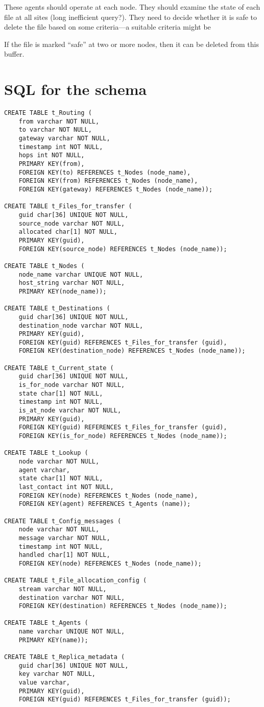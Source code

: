 \documentclass{cmspaper}
\begin{document}
These agents should operate at each node. They should examine the
state of each file at all sites (long inefficient query?). They need
to decide whether it is safe to delete the file based on some
criteria---a suitable criteria might be

If the file is marked ``safe'' at two or more nodes, then it can be
deleted from this buffer.

\section{SQL for the schema}

{\small \begin{verbatim}
CREATE TABLE t_Routing (
	from varchar NOT NULL, 
	to varchar NOT NULL, 
	gateway varchar NOT NULL, 
	timestamp int NOT NULL, 
	hops int NOT NULL, 
	PRIMARY KEY(from),
	FOREIGN KEY(to) REFERENCES t_Nodes (node_name),
	FOREIGN KEY(from) REFERENCES t_Nodes (node_name),
	FOREIGN KEY(gateway) REFERENCES t_Nodes (node_name));

CREATE TABLE t_Files_for_transfer (
	guid char[36] UNIQUE NOT NULL, 
	source_node varchar NOT NULL, 
	allocated char[1] NOT NULL, 
	PRIMARY KEY(guid),
	FOREIGN KEY(source_node) REFERENCES t_Nodes (node_name));

CREATE TABLE t_Nodes (
	node_name varchar UNIQUE NOT NULL, 
	host_string varchar NOT NULL, 
	PRIMARY KEY(node_name));

CREATE TABLE t_Destinations (
	guid char[36] UNIQUE NOT NULL, 
	destination_node varchar NOT NULL, 
	PRIMARY KEY(guid),
	FOREIGN KEY(guid) REFERENCES t_Files_for_transfer (guid),
	FOREIGN KEY(destination_node) REFERENCES t_Nodes (node_name));

CREATE TABLE t_Current_state (
	guid char[36] UNIQUE NOT NULL, 
	is_for_node varchar NOT NULL, 
	state char[1] NOT NULL, 
	timestamp int NOT NULL, 
	is_at_node varchar NOT NULL, 
	PRIMARY KEY(guid),
	FOREIGN KEY(guid) REFERENCES t_Files_for_transfer (guid),
	FOREIGN KEY(is_for_node) REFERENCES t_Nodes (node_name));

CREATE TABLE t_Lookup (
	node varchar NOT NULL, 
	agent varchar, 
	state char[1] NOT NULL, 
	last_contact int NOT NULL,
	FOREIGN KEY(node) REFERENCES t_Nodes (node_name),
	FOREIGN KEY(agent) REFERENCES t_Agents (name));

CREATE TABLE t_Config_messages (
	node varchar NOT NULL, 
	message varchar NOT NULL, 
	timestamp int NOT NULL, 
	handled char[1] NOT NULL,
	FOREIGN KEY(node) REFERENCES t_Nodes (node_name));

CREATE TABLE t_File_allocation_config (
	stream varchar NOT NULL, 
	destination varchar NOT NULL,
	FOREIGN KEY(destination) REFERENCES t_Nodes (node_name));

CREATE TABLE t_Agents (
	name varchar UNIQUE NOT NULL, 
	PRIMARY KEY(name));

CREATE TABLE t_Replica_metadata (
	guid char[36] UNIQUE NOT NULL, 
	key varchar NOT NULL, 
	value varchar, 
	PRIMARY KEY(guid),
	FOREIGN KEY(guid) REFERENCES t_Files_for_transfer (guid));
\end{verbatim}
}
\end{document}
